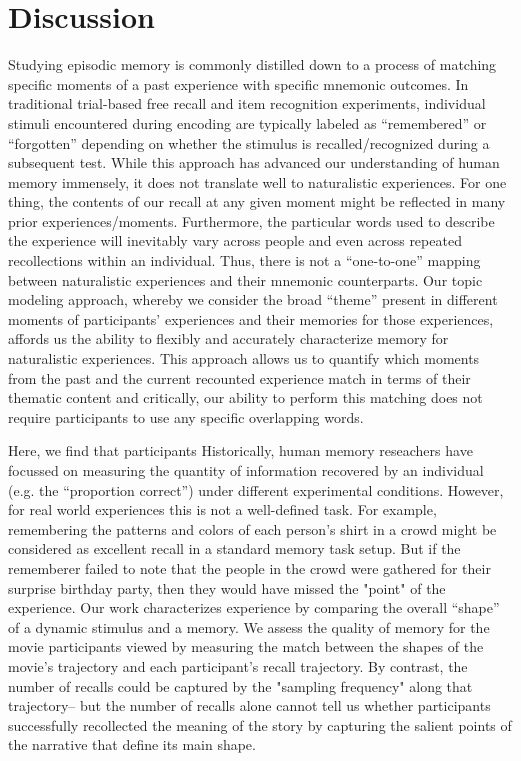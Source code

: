 \documentclass{article}
\begin{document}
{\section{Discussion}
\label{sec:discussion}
Studying episodic memory is commonly distilled down to a process of matching specific moments of a past experience with specific mnemonic outcomes.  In traditional trial-based free recall and item recognition experiments, individual stimuli encountered during encoding are typically labeled as ``remembered'' or ``forgotten'' depending on whether the stimulus is recalled/recognized during a subsequent test. While this approach has advanced our understanding of human memory immensely, it does not translate well to naturalistic experiences. For one thing, the contents of our recall at any given moment might be reflected in many prior experiences/moments. Furthermore, the particular words used to describe the experience will inevitably vary across people and even across repeated recollections within an individual. Thus, there is not a ``one-to-one'' mapping between naturalistic experiences and their mnemonic counterparts. Our topic modeling approach, whereby we consider the broad ``theme'' present in different moments of participants' experiences and their memories for those experiences, affords us the ability to flexibly and accurately characterize memory for naturalistic experiences. This approach allows us to quantify which moments from the past and the current recounted experience match in terms of their thematic content and critically, our ability to perform this matching does not require participants to use any specific overlapping words.

Here, we find that participants Historically, human memory reseachers have focussed on measuring the quantity of information recovered by an individual (e.g. the ``proportion correct'') under different experimental conditions. However, for real world experiences this is not a well-defined task. For example, remembering the patterns and colors of each person's shirt in a crowd might be considered as excellent recall in a standard memory task setup. But if the rememberer failed to note that the people in the crowd were gathered for their surprise birthday party, then they would have missed the "point" of the experience. Our work characterizes experience by comparing the overall ``shape'' of a dynamic stimulus and a memory. We assess the quality of memory for the movie participants viewed by measuring the match between the shapes of the movie's trajectory and each participant's recall trajectory. By contrast, the number of recalls could be captured by the "sampling frequency" along that trajectory-- but the number of recalls alone cannot tell us whether participants successfully recollected the meaning of the story by capturing the salient points of the narrative that define its main shape.

}
\end{document}
